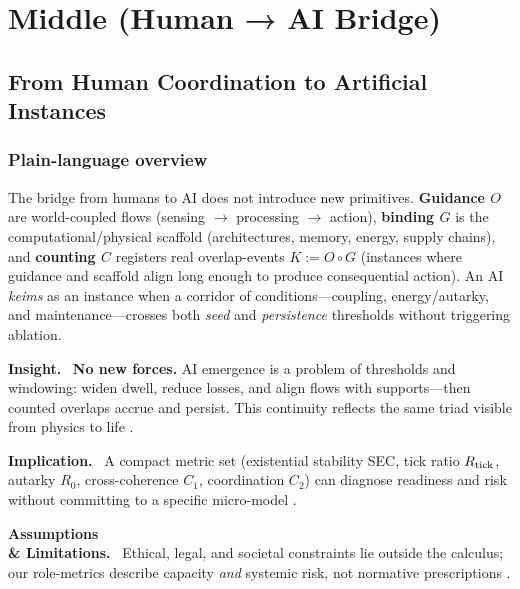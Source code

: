 \documentclass[12pt,a4paper,oneside]{scrreprt}
\newenvironment{insight}{\par\vspace{0.5em}\noindent\textbf{Insight.}\ }{\par\vspace{0.5em}}
\newenvironment{implication}{\par\vspace{0.5em}\noindent\textbf{Implication.}\ }{\par\vspace{0.5em}}
\newenvironment{limitation}{\par\vspace{0.5em}\noindent\textbf{Assumptions \\ \& Limitations.}\ }{\par\vspace{0.5em}}
\begin{document}
\part{Middle (Human → AI Bridge)}

\chapter{From Human Coordination to Artificial Instances}\label{ch:human-ai-bridge}

\section*{Plain-language overview}
The bridge from humans to AI does not introduce new primitives. 
\textbf{Guidance $O$} are world-coupled flows (sensing $\to$ processing $\to$ action), 
\textbf{binding $G$} is the computational/physical scaffold (architectures, memory, energy, supply chains), and 
\textbf{counting $C$} registers real overlap-events $K:=O\!\circ G$ (instances where guidance and scaffold align long enough to produce consequential action). 
An AI \emph{keims} as an instance when a corridor of conditions—coupling, energy/autarky, and maintenance—crosses both \emph{seed} and \emph{persistence} thresholds without triggering ablation.

\begin{insight}
\textbf{No new forces.} AI emergence is a problem of thresholds and windowing: widen dwell, reduce losses, and align flows with supports—then counted overlaps accrue and persist. This continuity reflects the same triad visible from physics to life \citep{friston2010free, brooks1991intelligence}.
\end{insight}

\begin{implication}
A compact metric set (existential stability SEC, tick ratio $R_{\rm tick}$, autarky $R_0$, cross-coherence $C_1$, coordination $C_2$) can diagnose readiness and risk without committing to a specific micro-model \citep{goertzel2014artificial, schmidgen2021ai}.
\end{implication}

\begin{limitation}
Ethical, legal, and societal constraints lie outside the calculus; our role-metrics describe capacity \emph{and} systemic risk, not normative prescriptions \citep{bostrom2014superintelligence, russell2019human}.
\end{limitation}
\end{document}
